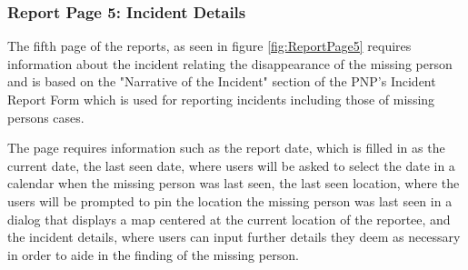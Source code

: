 \subsubsection{Report Page 5: Incident Details}

The fifth page of the reports, as seen in figure \ref{fig:ReportPage5} requires information about the incident relating the disappearance of the missing person and is based on the "Narrative of the Incident" section of the PNP's Incident Report Form which is used for reporting incidents including those of missing persons cases.

The page requires information such as the report date, which is filled in as the current date, the last seen date, where users will be asked to select the date in a calendar when the missing person was last seen, the last seen location, where the users will be prompted to pin the location the missing person was last seen in a dialog that displays a map centered at the current location of the reportee, and the incident details, where users can input further details they deem as necessary in order to aide in the finding of the missing person. 

